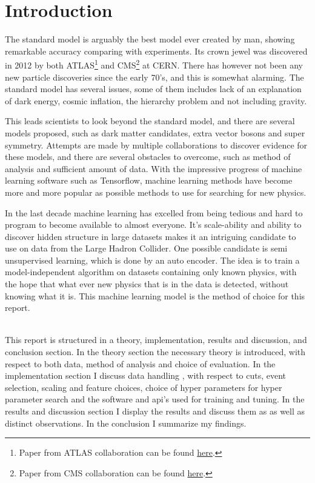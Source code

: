 \documentclass[ reprint, amsmath,amssymb, aps, nofootinbib]{revtex4-2}
\begin{document}
\section{Introduction}
The standard model is arguably the best model ever created by man, showing remarkable accuracy comparing with experiments. Its crown jewel was discovered in 2012 by both ATLAS\footnote{Paper from ATLAS collaboration can be found \href{https://arxiv.org/abs/1207.7214}{here}.} and CMS\footnote{Paper from CMS collaboration can be found \href{https://arxiv.org/abs/1207.7235}{here}.} at CERN. There has however not been any new particle discoveries since the early 70's, and this is somewhat alarming. The standard model has several issues, some of them includes lack of an explanation of dark energy, cosmic inflation, the hierarchy problem and not including gravity. \par 
This leads scientists to look beyond the standard model, and there are several models proposed, such as dark matter candidates, extra vector bosons and super symmetry. Attempts are made by multiple collaborations to discover evidence for these models, and there are several obstacles to overcome, such as method of analysis and sufficient amount of data. With the impressive progress of machine learning software such as Tensorflow\cite{tensorflow2015-whitepaper}, machine learning methods have become more and more popular as possible methods  to use for searching for new physics. \par 
In the last decade machine learning has excelled from being tedious and hard to program to become available to almost everyone. It's scale-ability and ability to discover hidden structure in large datasets makes it an intriguing candidate to use on data from the Large Hadron Collider. One possible candidate is semi unsupervised learning, which is done by an auto encoder. The idea is to train a model-independent algorithm on datasets containing only known physics, with the hope that what ever new physics that is in the data is detected, without knowing what it is.  This machine learning model is the method of choice for this report. \par
\\
This report is structured in a theory, implementation, results and discussion, and conclusion section. In the theory section the necessary theory is introduced, with respect to both data, method of analysis and choice of evaluation. In the implementation section I discuss data handling , with respect to cuts, event selection, scaling and feature choices, choice of hyper parameters for hyper parameter search and the software and api's used for training and tuning. In the results and discussion section I display the results and discuss them as as well as distinct observations. In the conclusion I summarize my findings. 
\end{document}
